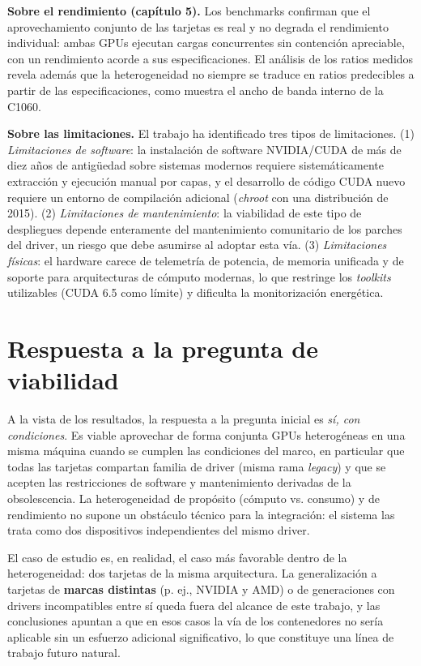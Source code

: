 \textbf{Sobre el rendimiento (capítulo 5).} Los benchmarks confirman que el aprovechamiento conjunto de las tarjetas es real y no degrada el rendimiento individual: ambas GPUs ejecutan cargas concurrentes sin contención apreciable, con un rendimiento acorde a sus especificaciones. El análisis de los ratios medidos revela además que la heterogeneidad no siempre se traduce en ratios predecibles a partir de las especificaciones, como muestra el ancho de banda interno de la C1060.

\textbf{Sobre las limitaciones.} El trabajo ha identificado tres tipos de limitaciones. (1) \emph{Limitaciones de software}: la instalación de software NVIDIA/CUDA de más de diez años de antigüedad sobre sistemas modernos requiere sistemáticamente extracción y ejecución manual por capas, y el desarrollo de código CUDA nuevo requiere un entorno de compilación adicional (\textit{chroot} con una distribución de 2015). (2) \emph{Limitaciones de mantenimiento}: la viabilidad de este tipo de despliegues depende enteramente del mantenimiento comunitario de los parches del driver, un riesgo que debe asumirse al adoptar esta vía. (3) \emph{Limitaciones físicas}: el hardware carece de telemetría de potencia, de memoria unificada y de soporte para arquitecturas de cómputo modernas, lo que restringe los \textit{toolkits} utilizables (CUDA 6.5 como límite) y dificulta la monitorización energética.

\section*{Respuesta a la pregunta de viabilidad}

A la vista de los resultados, la respuesta a la pregunta inicial es \emph{sí, con condiciones}. Es viable aprovechar de forma conjunta GPUs heterogéneas en una misma máquina cuando se cumplen las condiciones del marco, en particular que todas las tarjetas compartan familia de driver (misma rama \textit{legacy}) y que se acepten las restricciones de software y mantenimiento derivadas de la obsolescencia. La heterogeneidad de propósito (cómputo vs. consumo) y de rendimiento no supone un obstáculo técnico para la integración: el sistema las trata como dos dispositivos independientes del mismo driver.

El caso de estudio es, en realidad, el caso más favorable dentro de la heterogeneidad: dos tarjetas de la misma arquitectura. La generalización a tarjetas de \textbf{marcas distintas} (p. ej., NVIDIA y AMD) o de generaciones con drivers incompatibles entre sí queda fuera del alcance de este trabajo, y las conclusiones apuntan a que en esos casos la vía de los contenedores no sería aplicable sin un esfuerzo adicional significativo, lo que constituye una línea de trabajo futuro natural.

